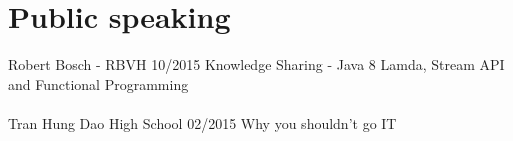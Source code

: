 \section*{Public speaking}
\event
{Robert Bosch - RBVH}
{10/2015}
{Knowledge Sharing - Java 8 Lamda, Stream API and Functional Programming}
\\
\\
\event
{Tran Hung Dao High School}
{02/2015}
{Why you shouldn't go IT}
